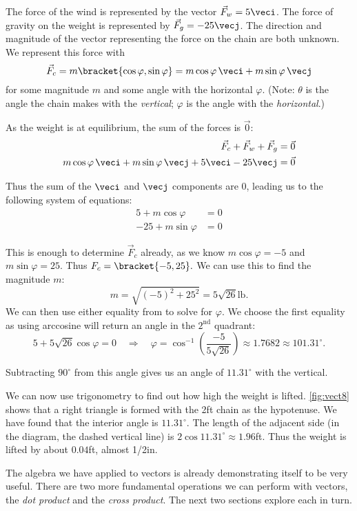 {The force of the wind is represented by the vector $\vec F_w = 5\veci$. The force of gravity on the weight is represented by $\vec F_g = -25\vecj$. The direction and magnitude of the vector representing the force on the chain are both unknown. We represent this force with
\[\vec F_c = m\bracket{\cos\varphi,\sin\varphi}= m\cos\varphi\, \veci + m\sin\varphi\,\vecj\]
for some magnitude $m$ and some angle with the horizontal $\varphi$. (Note: $\theta$ is the angle the chain makes with the \emph{vertical}; $\varphi$ is the angle with the \emph{horizontal}.)

As the weight is at equilibrium, the sum of the forces is $\vec0$:
\begin{align*}
\vec F_c + \vec F_w + \vec F_g &= \vec 0\\
m\cos\varphi\, \veci + m\sin\varphi\,\vecj + 5\veci - 25\vecj &=\vec 0
\end{align*}

Thus the sum of the $\veci$ and $\vecj$ components are 0, leading us to the following system of equations:
\begin{align}
5+m\cos\varphi &= 0\\
-25+m\sin\varphi &= 0
\label{eq:vect8}
\end{align}

This is enough to determine $\vec F_c$ already, as we know $m\cos \varphi = -5$ and $m\sin\varphi =25$. Thus $F_c =\bracket{-5,25}.$ We can use this to find the magnitude $m$:
\[m = \sqrt{(-5)^2+25^2} = 5\sqrt{26}%
\text{lb}.\]
We can then use either equality from  to solve for $\varphi$. We choose the first equality as using arccosine will return an angle in the $2^\text{nd}$ quadrant:
\[5 + 5\sqrt{26}\cos \varphi = 0 \quad \Rightarrow \quad \varphi = \cos^{-1}\left(\frac{-5}{5\sqrt{26}}\right) \approx 1.7682\approx 101.31^\circ.\]

Subtracting $90^\circ$ from this angle gives us an angle of $11.31^\circ$ with the vertical.

We can now use trigonometry to find out how high the weight is lifted. \autoref{fig:vect8} shows that a right triangle is formed with the 2ft chain as the hypotenuse.  We have found that the interior angle is $11.31^\circ$. The length of the adjacent side (in the diagram, the dashed vertical line) is $2\cos 11.31^\circ \approx 1.96$ft. Thus the weight is lifted by about $0.04$ft, almost 1/2in.}

The algebra we have applied to vectors is already demonstrating itself to be very useful. There are two more fundamental operations we can perform with vectors, the \emph{dot product} and the \emph{cross product}. The next two sections explore each in turn.

